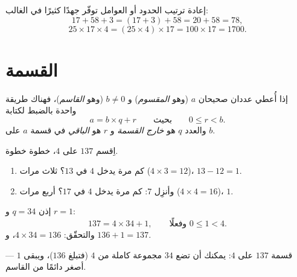 \begin{example}\label{ex:g6:wholes:smart}
إعادة ترتيب الحدود أو العوامل توفّر جهدًا كثيرًا في الغالب:
\[
17 + 58 + 3 = (17 + 3) + 58 = 20 + 58 = 78 ,
\]
\[
25 \times 17 \times 4 = (25 \times 4) \times 17 = 100 \times 17 = 1700 .
\]
\end{example}

\section{القسمة}

\begin{theorem}\label{thm:g6:wholes:division}
إذا أُعطي عددان صحيحان $a$ (وهو \emph{المقسوم}) و $b \neq 0$ (وهو
\emph{القاسم})، فهناك طريقة واحدة بالضبط لكتابة
\[
a = b \times q + r
\qquad\text{بحيث}\qquad
0 \leq r < b .
\]
والعدد $q$ هو \emph{خارج القسمة} و $r$ هو
\emph{الباقي} في قسمة $a$ على $b$.
\end{theorem}
\admitted

\begin{example}\label{ex:g6:wholes:division}
اِقسم $137$ على $4$، خطوة خطوة.
\begin{enumerate}
  \item كم مرة يدخل $4$ في $13$؟ ثلاث مرات
        ($4 \times 3 = 12$)،  $13 - 12 = 1$.
  \item وأنزِل $7$: كم مرة يدخل $4$ في $17$؟
        أربع مرات ($4 \times 4 = 16$)،  $1$.
\end{enumerate}
إذن $q = 34$ و $r = 1$:
\[
137 = 4 \times 34 + 1, \qquad\text{وفعلًا } 0 \leq 1 < 4 .
\]
والتحقّق: $4 \times 34 = 136$، و $136 + 1 = 137$.
\end{example}

\begin{omfigure}

{\small قسمة $137$ على $4$: يمكنك أن تضع $34$ مجموعة كاملة من $4$
(فتبلغ $136$)، ويبقى $1$ ---  أصغر دائمًا
من القاسم.}
\end{omfigure}

